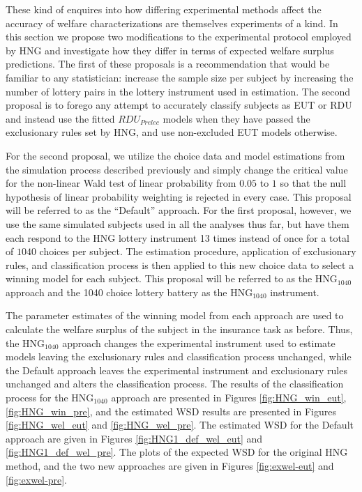 \documentclass[../main.tex]{subfiles}
\begin{document}
\addtocounter{footnote}{-1}

These kind of enquires into how differing experimental methods affect the accuracy of welfare characterizations are themselves experiments of a kind.
In this section we propose two modifications to the experimental protocol employed by HNG and investigate how they differ in terms of expected welfare surplus predictions.
The first of these proposals is a recommendation that would be familiar to any statistician: increase the sample size per subject by increasing the number of lottery pairs in the lottery instrument used in estimation.
The second proposal is to forego any attempt to accurately classify subjects as EUT or RDU and instead use the fitted $\mathit{RDU_{Prelec}}$ models when they have passed the exclusionary rules set by HNG, and use non-excluded EUT models otherwise.

For the second proposal, we utilize the choice data and model estimations from the simulation process described previously and simply change the critical value for the non-linear Wald test of linear probability from $0.05$ to $1$ so that the null hypothesis of linear probability weighting is rejected in every case.
This proposal will be referred to as the \enquote{Default} approach.
For the first proposal, however, we use the same simulated subjects used in all the analyses thus far, but have them each respond to the HNG lottery instrument 13 times instead of once for a total of $1040$ choices per subject.
The estimation procedure, application of exclusionary rules, and classification process is then applied to this new choice data to select a winning model for each subject.
This proposal will be referred to as the $\text{HNG}_{1040}$ approach and the 1040 choice lottery battery as the $\text{HNG}_{1040}$ instrument.

The parameter estimates of the winning model from each approach are used to calculate the welfare surplus of the subject in the insurance task as before.
Thus, the $\text{HNG}_{1040}$ approach changes the experimental instrument used to estimate models leaving the exclusionary rules and classification process unchanged, while the Default approach leaves the experimental instrument and exclusionary rules unchanged and alters the classification process.
The results of the classification process for the $\text{HNG}_{1040}$ approach are presented in Figures \ref{fig:HNG_win_eut}, \ref{fig:HNG_win_pre}, and the estimated WSD results are presented in Figures \ref{fig:HNG_wel_eut} and \ref{fig:HNG_wel_pre}.
The estimated WSD for the Default approach are given in Figures \ref{fig:HNG1_def_wel_eut} and \ref{fig:HNG1_def_wel_pre}.
The plots of the expected WSD for the original HNG method, and the two new approaches are given in Figures \ref{fig:exwel-eut} and \ref{fig:exwel-pre}.
\end{document}
